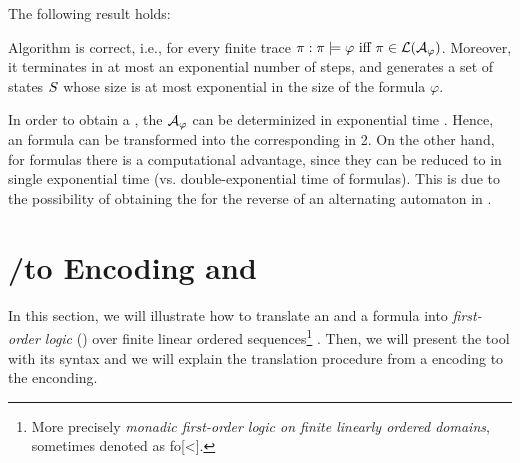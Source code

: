 The following result holds:
\begin{theorem}\label{ldlf2nfa-correctness}
Algorithm \LTLfToNFA is correct, i.e., for every finite trace $\pi: \pi \models \varphi \ \text{iff}\  \pi \in \mathcal{L}(\mathcal{A}_\varphi)$. Moreover, it terminates in at most an exponential number of steps, and generates a set of states $S$ whose size is at most exponential in the size of the formula $\varphi$.
\end{theorem}

In order to obtain a \DFA, the \NFA $\mathcal{A}_\varphi$ can be determinized in exponential time \citep{Rabin:1959:FAD:1661907.1661909}. Hence, an \LTLf formula can be transformed into the corresponding \DFA in 2\EXPTIME. On the other hand, for \PLTL formulas there is a computational advantage, since they can be reduced to \DFA in single exponential time (vs. double-exponential time of \LTLf formulas). This is due to the possibility of obtaining the \DFA for the reverse of an alternating automaton in \EXPTIME \citep{chandra1981acm}.

\section{\LTLf/\PLTL to \FOL Encoding and \MONA}\label{sec:mona-encoding}
In this section, we will illustrate how to translate an \LTLf and a \PLTL formula into \emph{first-order logic} (\FOL) over finite linear ordered sequences\footnote{More precisely \textit{monadic first-order logic on finite linearly ordered domains}, sometimes denoted as \sc fo[<].} \citep{de2013linear,zpv2018}. Then, we will present the \MONA tool with its syntax and we will explain the translation procedure from a \FOL encoding to the \MONA enconding.
